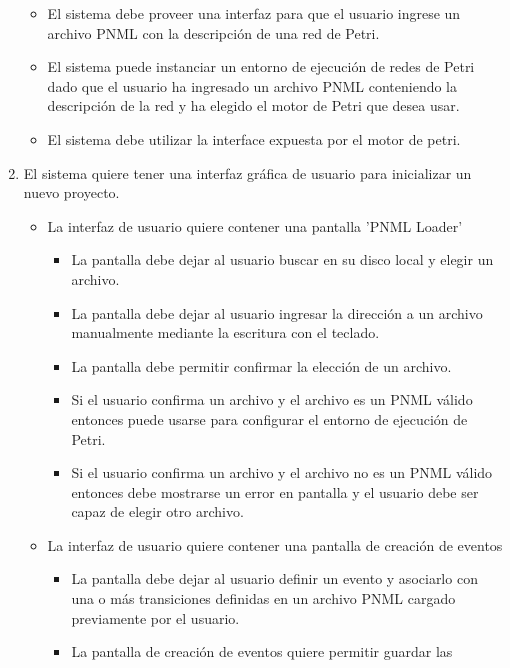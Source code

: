 \begin{enumerate}
	\begin{itemize}
	    \item El sistema debe proveer una interfaz para que el usuario ingrese un
	    archivo PNML con la descripción de una red de Petri.
	    \item El sistema puede instanciar un entorno de ejecución de redes de
	    Petri dado que el usuario ha ingresado un archivo PNML conteniendo la
	    descripción de la red y ha elegido el motor de Petri que desea usar. 
	    \item El sistema debe utilizar la interface expuesta por el motor de
	    petri.
	\end{itemize}
	\item El sistema quiere tener una interfaz gráfica de usuario para inicializar
	un nuevo proyecto.
	\begin{itemize}
	    \item La interfaz de usuario quiere contener una pantalla 'PNML Loader'
	    	\begin{itemize}
	    	    \item La pantalla debe dejar al usuario buscar en su disco local y
	    	    elegir un archivo.
	    	    \item La pantalla debe dejar al usuario ingresar la dirección a un
	    	    archivo manualmente mediante la escritura con el teclado.
	    	    \item La pantalla debe permitir confirmar la elección de un archivo.
	    	    \item Si el usuario confirma un archivo y el archivo es un PNML válido
	    	    entonces puede usarse para configurar el entorno de ejecución de
	    	    Petri.
	    	    \item Si el usuario confirma un archivo y el archivo no es un PNML
	    	    válido entonces debe mostrarse un error en pantalla y el usuario debe
	    	    ser capaz de elegir otro archivo.
	    	\end{itemize}
	    \item La interfaz de usuario quiere contener una pantalla de creación de
	    eventos
	    \begin{itemize}
	    	    \item La pantalla debe dejar al usuario definir un evento y asociarlo
	    	    con una o más transiciones definidas en un archivo PNML cargado
	    	    previamente por el usuario.
	    	    \item La pantalla de creación de eventos quiere permitir guardar las

\end{itemize}
\end{itemize}
\end{enumerate}
